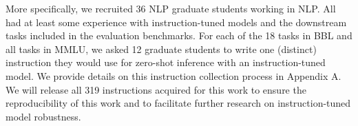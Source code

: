 More specifically, we recruited 36 NLP graduate students working in NLP.
All had at least some experience with instruction-tuned models and the downstream tasks included in the evaluation benchmarks. 
For each of the 18 tasks in \textsc{BBL} and all tasks in \textsc{MMLU}, we asked 12 graduate students to write one (distinct) instruction they would use for zero-shot inference with an instruction-tuned model. 
We provide details on this instruction collection process in Appendix A. 
We will release all 319 instructions acquired for this work to ensure the reproducibility of this work and to facilitate further research on instruction-tuned model robustness. 









